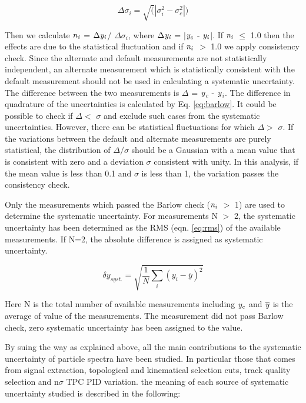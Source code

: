 \begin{equation}
 \Delta\sigma_{i} = \sqrt(|\sigma_{i}^{2} - \sigma_{c}^{2}|)
 \label {eq:barlow}
\end{equation}

Then we calculate $\it{n}_{i}$ = $\Delta\it{y}_{i}$/ $\Delta\sigma_{i}$, where  $\Delta\it{y}_{i}$ = $|$$\it{y}_{c}$ - $\it{y}_{i}$$|$.
If $\it{n}_{i}$ $\leq$ 1.0 then the effects are due to the statistical fluctuation and if $\it{n}_{i}$ $>$ 1.0 we apply consistency check. Since the alternate and default measurements are not statistically independent, an alternate measurement which is statistically consistent with the default measurement should not be used in calculating a systematic uncertainty. The difference between the two measurements is $\Delta$ = $\it{y}$$_{c}$ - $\it{y}$$_{i}$. The difference in quadrature of the uncertainties is calculated by Eq. \ref{eq:barlow}. 
It could be possible to check if $\Delta$$<$ $\sigma$ and exclude such cases from the systematic uncertainties. However, there can be statistical fluctuations for which $\Delta$$>$ $\sigma$. If the variations between the default and alternate measurements are purely statistical, the distribution of $\Delta$$/$$\sigma$ should be a Gaussian with a mean value that is consistent with zero and a deviation $\sigma$ consistent with unity. In this analysis, if the mean value is less than 0.1 and $\sigma$ is less than 1, the variation passes the consistency check.

Only the measurements which passed the Barlow check ($\it{n}_{i}$ $>$ 1) are used to determine the systematic uncertainty. For measurements N $>$ 2, the systematic uncertainty has been determined as the RMS (eqn. \ref{eq:rms}) of the available measurements. If N=2, the absolute difference is assigned as systematic uncertainty.

\begin{equation}
\delta y_{syst.}=\sqrt{\frac{1}{N}\sum_{i}(y_{i}-\overline{y})^{2}}
\label{eq:rms}
\end{equation}

Here N is the total number of available measurements including $\it{y}_{c}$ and $\overline{\it{y}}$ is the average of value of the measurements. The measurement did not pass Barlow check, zero systematic uncertainty has been assigned to the value.

By suing the way as explained above, all the main contributions to the systematic uncertainty of particle spectra have been studied. In particular those that comes from signal extraction, topological and kinematical selection cuts, track quality selection and n$\sigma$ TPC PID variation. the meaning of each source of systematic uncertainty studied is described in the following: \\

